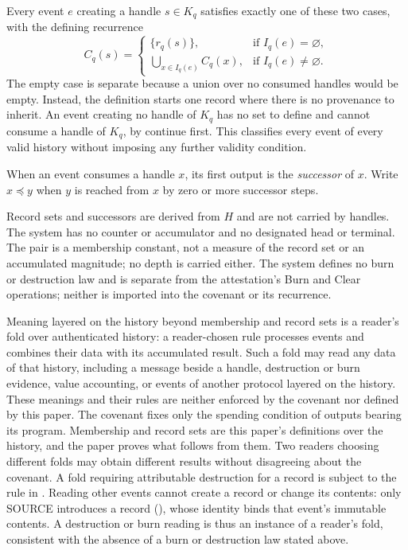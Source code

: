 \documentclass[../main.tex]{subfiles}
\begin{document}
\begin{definition}
\label{def:kpcfixed-operations:classification}
Every event $e$ creating a handle $s\in K_q$ satisfies exactly one of these
two cases, with the defining recurrence
\[
 C_q(s)=
 \begin{cases}
 \{r_q(s)\},&\text{if }I_q(e)=\varnothing,\\
 \displaystyle\bigcup_{x\in I_q(e)}C_q(x),&\text{if }I_q(e)\ne\varnothing.
 \end{cases}
\]
The empty case is separate because a union over no consumed handles would
be empty. Instead, the definition starts one record where there is no
provenance to inherit.
An event creating no handle of $K_q$ has no set to define and cannot
consume a handle of $K_q$, by continue first. This classifies every event of every valid
history without imposing any further validity condition.
\end{definition}

\begin{definition}[Continuation]
\label{def:kpcfixed-operations:continuation}
When an event consumes a handle $x$, its first output is the
\emph{successor} of $x$. Write $x\preceq y$ when $y$ is reached from $x$
by zero or more successor steps.
\end{definition}

Record sets and successors are derived from $H$ and are not carried by
handles. The system has no counter or accumulator and no designated head or terminal.
The pair is a membership constant, not a measure of the record set or
an accumulated magnitude; no depth is carried either.
The system defines no burn or destruction law and is separate from the
attestation's Burn and Clear operations; neither is imported into the
covenant or its recurrence.

\begin{remark}
\label{rem:kpcfixed-operations:reader-folds}
Meaning layered on the history beyond membership and record sets is a
reader's fold over authenticated history: a reader-chosen rule processes
events and combines their data with its accumulated result. Such a fold
may read any data of that history, including a message beside a handle,
destruction or burn evidence, value accounting, or events of another
protocol layered on the history. These meanings and their rules are
neither enforced by the covenant nor defined by this paper. The covenant
fixes only the spending condition of outputs bearing its program.
Membership and record sets are this paper's definitions over the history,
and the paper proves what follows from them. Two readers choosing different
folds may obtain different results without disagreeing about the covenant.
A fold requiring attributable destruction for a record is subject to the
rule in . Reading other events cannot
create a record or change its contents: only SOURCE introduces a record
(), whose identity binds
that event's immutable contents. A destruction or burn reading is thus an
instance of a reader's fold, consistent with the absence of a burn or
destruction law stated above.
\end{remark}
\end{document}

